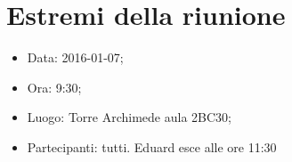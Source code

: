 \documentclass[../Riunione16-01-07.tex]{subfiles}
\begin{document}
\section{Estremi della riunione}
	\begin{itemize}
		\item Data: 2016-01-07;
		\item Ora: 9:30;
		\item Luogo: Torre Archimede aula 2BC30;
		\item Partecipanti: tutti. Eduard esce alle ore 11:30
	\end{itemize}
\end{document}
